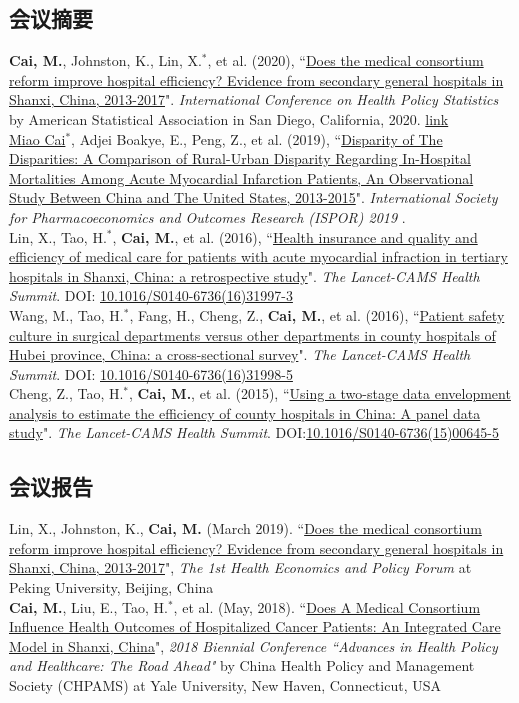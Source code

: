 \documentclass[11pt, a4paper]{article}
\newcommand{\years}[1]{\marginnote{\scriptsize #1}}
\begin{document}
\subsection*{会议摘要}
\noindent
\years{2020}\textbf{Cai, M.}, Johnston, K., Lin, X.$^\ast$, et al. (2020), ``\ul{Does the medical consortium reform improve hospital efficiency? Evidence from secondary general hospitals in Shanxi, China, 2013-2017}". \emph{International Conference on Health Policy Statistics} by American Statistical Association in San Diego, California, 2020. \href{https://ww2.amstat.org/meetings/ichps/2020/onlineprogram/AbstractDetails.cfm?AbstractID=306703}{link}\\
\years{2019}\underline{Miao Cai$^\ast$}, Adjei Boakye, E., Peng, Z., et al. (2019), ``\ul{Disparity of The Disparities: A Comparison of Rural-Urban Disparity Regarding In-Hospital Mortalities Among Acute Myocardial Infarction Patients, An Observational Study Between China and The United States, 2013-2015}". \emph{International Society for Pharmacoeconomics and Outcomes Research (ISPOR) 2019 }. \\
\years{2016}Lin, X., Tao, H.$^\ast$, \textbf{Cai, M.}, et al. (2016), ``\ul{Health insurance and quality and efficiency of medical care for patients with acute myocardial infraction in tertiary hospitals in Shanxi, China: a retrospective study}". \emph{The Lancet-CAMS Health Summit}. DOI: \href{https://doi.org/10.1016/S0140-6736(16)31997-3}{10.1016/S0140-6736(16)31997-3}\\
\years{2016}Wang, M., Tao, H.$^\ast$, Fang, H., Cheng, Z., \textbf{Cai, M.}, et al. (2016), ``\ul{Patient safety culture in surgical departments versus other departments in county hospitals of Hubei province, China: a cross-sectional survey}". \emph{The Lancet-CAMS Health Summit}. DOI: \href{https://doi.org/10.1016/S0140-6736(16)31998-5}{10.1016/S0140-6736(16)31998-5}\\
\years{2015}Cheng, Z., Tao, H.$^\ast$, \textbf{Cai, M.}, et al.  (2015), ``\ul{Using a two-stage data envelopment analysis to estimate the efficiency of county hospitals in China: A panel data study}". \emph{The Lancet-CAMS Health Summit}. DOI:\href{https://doi.org/10.1016/S0140-6736(15)00645-5}{10.1016/S0140-6736(15)00645-5} 

\subsection*{会议报告}
\noindent
\years{2019}Lin, X., Johnston, K., \textbf{Cai, M.} (March 2019). ``\ul{Does the medical consortium reform improve hospital efficiency? Evidence from secondary general hospitals in Shanxi, China, 2013-2017}", \emph{The 1st Health Economics and Policy Forum} at Peking University, Beijing, China\\
\years{2018}\textbf{Cai, M.}, Liu, E., Tao, H.$^\ast$, et al. (May, 2018). ``\ul{Does A Medical Consortium Influence Health Outcomes of Hospitalized Cancer Patients: An Integrated Care Model in Shanxi, China}", \emph{2018 Biennial Conference ``Advances in Health Policy and Healthcare: The Road Ahead"} by China Health Policy and Management Society (CHPAMS) at Yale University, New Haven, Connecticut, USA
\end{document}
